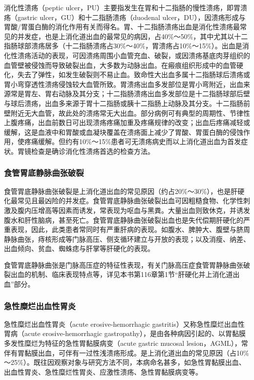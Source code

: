 消化性溃疡（peptic
ulcer，PU）主要指发生在胃和十二指肠的慢性溃疡，即胃溃疡（gastric
ulcer，GU）和十二指肠溃疡（duodenal
ulcer，DU），因溃疡形成与胃酸/胃蛋白酶的消化作用有关而得名。胃、十二指肠溃疡出血是消化性溃疡最常见的并发症，也是上消化道出血的最常见的病因，占40\%～50\%，其中尤其以十二指肠球部溃疡居多（十二指肠溃疡占30\%～40\%，胃溃疡占10\%～15\%）。出血是消化性溃疡活动的表现，可因溃疡周围小血管充血、破裂，或因溃疡基底肉芽组织的血管壁被侵蚀而导致破裂出血，大多数为动脉出血。在瘢痕组织形成中的血管硬化，失去了弹性，如发生破裂则不易止血。致命性大出血多属十二指肠球后溃疡或胃小弯穿透性溃疡侵蚀较大血管所致。胃溃疡出血多发部位是胃小弯附近，出血来源常是胃左、胃右动脉及其分支；十二指肠溃疡出血多发部位是十二指肠球部后壁与球后溃疡，出血多来源于胃十二指肠或胰十二指肠上动脉及其分支。十二指肠前壁附近无大血管，故此处的溃疡常无大出血。部分病例可有典型的周期性、节律性上腹疼痛，出血前数日可出现溃疡疼痛加重及疼痛规律的改变；出血后疼痛减轻或缓解，这是血液中和胃酸或血凝块覆盖在溃疡面上减少了胃酸、胃蛋白酶的侵蚀作用，使疼痛缓解。但约有10\%～15\%患者可无溃疡病史而以上消化道出血为首发症状。胃镜检查是确诊消化性溃疡首选的检查方法。

\subsubsection{食管胃底静脉曲张破裂}

食管胃底静脉曲张破裂是上消化道出血的常见原因（约占20\%～30\%），也是肝硬化最常见且最凶险的并发症。食管胃底静脉曲张破裂出血可因粗糙食物、化学性刺激及腹内压增高等因素而诱发，常表现为呕血与黑粪。大量出血则致休克，并诱发腹水和肝性脑病，甚至死亡。食管胃底静脉曲张破裂出血也是失代偿期肝硬化的严重表现，因此，此类患者常同时有严重肝病的表现。如腹水、脾肿大、腹壁与脐周静脉曲张，痔核形成等门脉高压、侧支循环建立与开放的表现；以及消瘦、纳差、出血倾向、贫血、蜘蛛痣与肝掌等肝硬化的表现。

食管胃底静脉曲张是门脉高压症的特征性表现，有关门脉高压症食管胃静脉曲张破裂出血的机制、临床表现特点等，详见本书第116章第1节“肝硬化并上消化道出血”部分。

\subsubsection{急性糜烂出血性胃炎}

急性糜烂出血性胃炎（acute erosive-hemorrhagic
gastritis）又称急性糜烂出血性胃病（acute erosive-hemorrhagic
gastropathy），是由各种病因引起的、以胃黏膜多发性糜烂为特征的急性胃黏膜病变（acute
gastric mucosal
lesion，AGML），常伴有胃黏膜出血，可伴有一过性浅溃疡形成。是上消化道出血的常见原因（占10\%～25\%）。既往因观察对象与研究方法不同，本病命名甚多，如急性胃黏膜出血、出血性胃炎、急性糜烂性胃炎、应激性溃疡、急性胃黏膜病变等。

